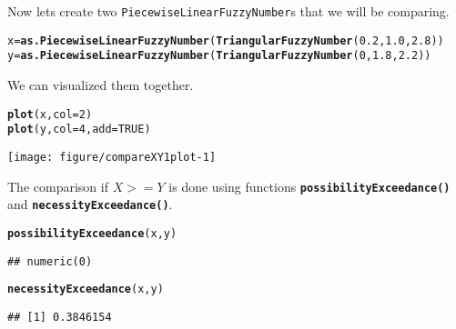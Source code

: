 \documentclass[11pt]{article}\usepackage[]{graphicx}\usepackage[]{color}
\makeatletter
\newcommand{\hlnum}[1]{\textcolor[rgb]{0.686,0.059,0.569}{#1}}%
\newcommand{\hlstd}[1]{\textcolor[rgb]{0.345,0.345,0.345}{#1}}%
\newcommand{\hlkwb}[1]{\textcolor[rgb]{0.69,0.353,0.396}{#1}}%
\newcommand{\hlkwc}[1]{\textcolor[rgb]{0.333,0.667,0.333}{#1}}%
\newcommand{\hlkwd}[1]{\textcolor[rgb]{0.737,0.353,0.396}{\textbf{#1}}}%
\newenvironment{kframe}{%
 \def\at@end@of@kframe{}%
 \ifinner\ifhmode%
  \def\at@end@of@kframe{\end{minipage}}%
  \begin{minipage}{\columnwidth}%
 \fi\fi%
 \def\FrameCommand##1{\hskip\@totalleftmargin \hskip-\fboxsep
 \colorbox{shadecolor}{##1}\hskip-\fboxsep
     \hskip-\linewidth \hskip-\@totalleftmargin \hskip\columnwidth}%
 \MakeFramed {\advance\hsize-\width
   \@totalleftmargin\z@ \linewidth\hsize
   \@setminipage}}%
 {\par\unskip\endMakeFramed%
 \at@end@of@kframe}
\newenvironment{knitrout}{}{} %
\newcommand{\func}[1]{\texttt{\hlkwd{#1}}}
\makeatother
\begin{document}
Now lets create two \texttt{PiecewiseLinearFuzzyNumber}s that we will be comparing.
\begin{knitrout}\small
{}\color{fgcolor}\begin{kframe}
\begin{alltt}
\hlstd{x} \hlkwb{=} \hlkwd{as.PiecewiseLinearFuzzyNumber}\hlstd{(}\hlkwd{TriangularFuzzyNumber}\hlstd{(}\hlnum{0.2}\hlstd{,} \hlnum{1.0}\hlstd{,} \hlnum{2.8}\hlstd{))}
\hlstd{y} \hlkwb{=} \hlkwd{as.PiecewiseLinearFuzzyNumber}\hlstd{(}\hlkwd{TriangularFuzzyNumber}\hlstd{(}\hlnum{0}\hlstd{,} \hlnum{1.8}\hlstd{,} \hlnum{2.2}\hlstd{))}
\end{alltt}
\end{kframe}
\end{knitrout}
We can visualized them together.
\begin{knitrout}\small
{}\color{fgcolor}\begin{kframe}
\begin{alltt}
\hlkwd{plot}\hlstd{(x,} \hlkwc{col}\hlstd{=}\hlnum{2}\hlstd{)}
\hlkwd{plot}\hlstd{(y,} \hlkwc{col}\hlstd{=}\hlnum{4}\hlstd{,} \hlkwc{add}\hlstd{=}\hlnum{TRUE}\hlstd{)}
\end{alltt}
\end{kframe}

{\centering \texttt{[image: figure/compareXY1plot-1]} 

}



\end{knitrout}
The comparison if $X>=Y$ is done using functions \func{possibilityExceedance()} and \func{necessityExceedance()}.
\begin{knitrout}\small
{}\color{fgcolor}\begin{kframe}
\begin{alltt}
\hlkwd{possibilityExceedance}\hlstd{(x,y)}
\end{alltt}
\begin{verbatim}
## numeric(0)
\end{verbatim}
\begin{alltt}
\hlkwd{necessityExceedance}\hlstd{(x,y)}
\end{alltt}
\begin{verbatim}
## [1] 0.3846154
\end{verbatim}
\end{kframe}
\end{knitrout}
\end{document}
